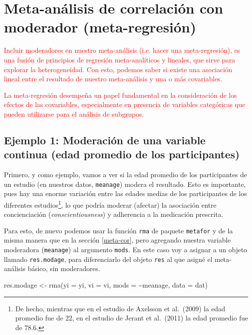 \documentclass[
  bookmarksnumbered]{article}
\newenvironment{Shaded}{\begin{snugshade}}{\end{snugshade}}
\newcommand{\AttributeTok}[1]{\textcolor[rgb]{0.00,0.34,0.68}{#1}}
\newcommand{\FunctionTok}[1]{\textcolor[rgb]{0.39,0.29,0.61}{#1}}
\newcommand{\NormalTok}[1]{\textcolor[rgb]{0.12,0.11,0.11}{#1}}
\newcommand{\OtherTok}[1]{\textcolor[rgb]{0.00,0.43,0.16}{#1}}
\newcommand{\SpecialCharTok}[1]{\textcolor[rgb]{0.24,0.68,0.91}{#1}}
\begin{document}
\hypertarget{met-moderation}{%
\section{Meta-análisis de correlación con moderador (meta-regresión)}\label{met-moderation}}

\textcolor{red}{Incluir moderadores en nuestro meta-análisis (i.e. hacer una meta-regresión), es una fusión de principios de regresión meta-analíticos y lineales, que sirve para explorar la heterogeneidad. Con esto, podemos saber si existe una asociación lineal entre el resultado de nuestro meta-análisis y una o más covariables.}

\textcolor{red}{La meta-regresión desempeña un papel fundamental en la consideración de los efectos de las covariables, especialmente en presencia de variables categóricas que pueden utilizarse para el análisis de subgrupos.}

\hypertarget{ex.mod1}{%
\subsection{Ejemplo 1: Moderación de una variable continua (edad promedio de los participantes)}\label{ex.mod1}}

Primero, y como ejemplo, vamos a ver si la edad promedio de los participantes de un estudio (en nuestros datos, \texttt{meanage}) modera el resultado. Esto es importante, pues hay una enorme variación entre las edades medias de los participantes de los diferentes estudios\footnote{De hecho, mientras que en el estudio de Axelsson et al.~(2009) la edad promedio fue de 22, en el estudio de Jerant et al.~(2011) la edad promedio fue de 78.6.}, lo que podría moderar (afectar) la asociación entre concienciación (\emph{conscientiousness}) y adherencia a la medicación prescrita.

Para esto, de nuevo podemos usar la función \texttt{rma} de paquete \texttt{metafor} y de la misma manera que en la sección \ref{meta-cor}, pero agregando nuestra variable moderadora (\texttt{meanage}) al argumento \texttt{mods}. En este caso voy a asignar a un objeto llamado \texttt{res.modage}, para diferenciarlo del objeto \texttt{res} al que asigné el meta-análisis básico, sin moderadores.

\begin{Shaded}
\begin{Highlighting}[]
\NormalTok{res.modage }\OtherTok{\textless{}{-}} \FunctionTok{rma}\NormalTok{(}\AttributeTok{yi =}\NormalTok{ yi, }\AttributeTok{vi =}\NormalTok{ vi, }\AttributeTok{mods =} \SpecialCharTok{\textasciitilde{}}\NormalTok{meanage, }\AttributeTok{data =}\NormalTok{ dat)}
\end{Highlighting}
\end{Shaded}
\end{document}
